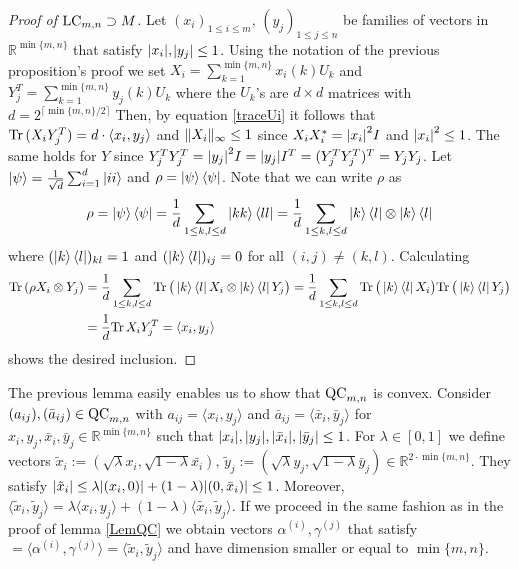 \begin{proof}[Proof of $ \textup{LC}_{m,n} \supset M $]
Let $ (x_i)_{1 \le i \le m}, \, (y_j)_{1 \le j \le n} $ be families of vectors in $\mathbb{R}^{\min \{ m,n \}}$ that satisfy 
$ {\left|{x_i}\right|},$$ {\left|{y_j}\right|} \le 1 $. 
Using the notation of the previous proposition's proof we set $ X_i = \sum_{k=1}^{\min \{m,n\}} x_i(k)U_k $ and $ Y_j^{T } = \sum_{k=1}^{\min \{m,n\}}y_j(k)U_k $ where the $ U_k $'s are $ d \times d $ matrices with $  d = 2^{\lceil \min \{m,n\}/2 \rceil} $
Then, by equation \ref{traceUi} it follows that $ \textup{Tr} \, {(X_iY_j^T)}  = d\cdot \langle x_i, y_j \rangle  $ and $  \Vert {X_i} \Vert_{\infty} \le 1 $ since $ X_iX_i^* = {\left|{x_i}\right|}^2I $ and $ {\left|{x_i}\right|}^2 \le 1  $. The same holds for $ Y $ since $ Y_j^TY_j^T =   {\left|{y_j}\right|}^2I = {\left|{y_j}\right|}I^T = (Y_j^TY_j^T)^T = Y_jY_j  $.
Let $ \ket{\psi} = \frac{1}{\sqrt{d}}\sum_{i= 1}^{d}\ket{ii} $ and $ \rho = \ket{\psi}\bra{\psi} $. Note that we can write $ \rho $ as
\begin{align*}
\rho = \ket{\psi}\bra{\psi} = \frac{1}{d}\sum_{1 \le k,l \le d}\ket{kk}\bra{ll} = \frac{1}{d} \sum_{1 \le k,l \le d}\ket{k}\bra{l} \otimes \ket{k}\bra{l}
\end{align*}
where $  (\ket{k}\bra{l})_{kl} = 1 $ and $ (\ket{k}\bra{l})_{ij} = 0 $ for all $ (i,j)\neq (k,l) $.
Calculating
\begin{align*}
\textup{Tr} \, {(\rho X_i \otimes Y_j)}  &=\frac{1}{d} \sum_{1 \le k,l \le d} \textup{Tr} \, { \big (\ket{k}\bra{l}X_i \otimes \ket{k}\bra{l}Y_j \big )}  = \frac{1}{d} \sum_{1 \le k,l \le d} \textup{Tr} \, {\big (\ket{k}\bra{l}X_i \big )}  \textup{Tr} \, {\big (\ket{k}\bra{l}Y_j \big )}  \\
&=  \frac{1}{d} \textup{Tr} \, {X_iY_j^T}  = \langle x_i,y_j \rangle
\end{align*}
shows the desired inclusion. 
\end{proof}
\noindent The previous lemma easily enables us to show that $ \textup{QC}_{m,n} $ is convex. Consider $ (a_{ij}), (\bar{a}_{ij}) \in \textup{QC}_{m,n} $ with $ a_{ij} = \langle x_i, y_j \rangle $ and $ \bar{a}_{ij} = \langle \bar{x}_i, \bar{y}_j \rangle $ for $ x_{i},y_j, \bar{x}_i,\bar{y}_j \in \mathbb{R}^{\min \{m,n\}} $ such that $ {\left|{x_i}\right|},{\left|{y_j}\right|}, {\left|{\bar{x}_i}\right|}, {\left|{\bar{y}_j}\right|} \le 1 $.
For $ \lambda \in [0,1] $ we define vectors $\tilde{x}_i:= (\sqrt{\lambda}x_i,\sqrt{1-\lambda}\bar{x_i}), \, \tilde{y}_j:= (\sqrt{\lambda}y_j, \sqrt{1-\lambda}\bar{y}_j) \in \mathbb{R}^{2\cdot \min \{m,n\} } $. They satisfy $ {\left|{\tilde{x}_i}\right|} \le \lambda {\left|{(x_i,0)}\right|} + (1-\lambda){\left|{(0,\bar{x}_i)}\right|} \le 1 $. Moreover, $ \langle \tilde{x}_i, \tilde{y}_j \rangle = \lambda \langle x_i,y_j \rangle + (1-\lambda) \langle \tilde{x_i},\tilde{y}_j \rangle$. If we proceed in the same fashion as in the proof of lemma \ref{LemQC} we obtain vectors 
$ \alpha^{(i)},\gamma^{(j)} $ that satisfy $= \langle \alpha^{(i)},\gamma^{(j)} \rangle = \langle \tilde{x} _i, \tilde{y}_j\rangle $ and have dimension smaller or equal to $ \min \{m,n\} $.


